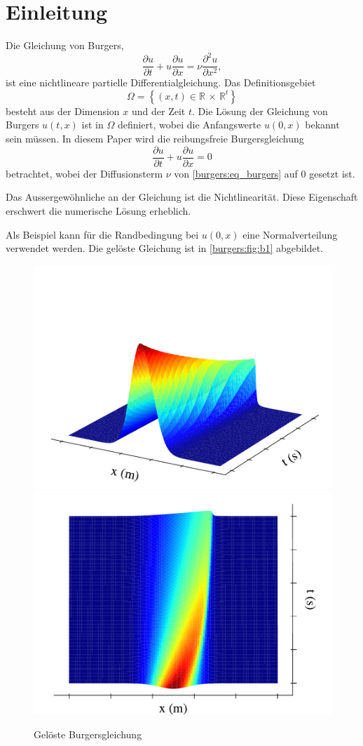 %
%
\section{Einleitung \label{burgers:section:einleitung}}

	Die Gleichung von Burgers,
	\begin{equation}
		  \frac {\partial u}{\partial t}+u{\frac {\partial u}{\partial x}}=\nu {\frac {\partial ^{2}u}{\partial x^{2}}},
		  \label{burgers:eq_burgers}
	\end{equation}
	ist eine nichtlineare partielle Differentialgleichung.
	Das Definitionsgebiet
	\begin{equation}
		\Omega = \left \{ (x,t) \in  \mathbb{R} \, \times \,  \mathbb{R}^t \right \}
	\end{equation}
	besteht aus der Dimension $x$ und der Zeit $t$.
	Die Lösung der Gleichung von Burgers $u(t,x)$ ist in $\Omega$ definiert, wobei die Anfangswerte $u(0,x)$ bekannt sein müssen.
	In diesem Paper wird die reibungsfreie Burgersgleichung
	\begin{equation}
		\frac {\partial u}{\partial t}+u{\frac {\partial u}{\partial x}}=0
		\label{burgers:eq_invisid_burgers}
	\end{equation}
	betrachtet, wobei der Diffusionsterm $\nu$ von \eqref{burgers:eq_burgers} auf 0 gesetzt ist.

	Das Aussergewöhnliche an der Gleichung ist die Nichtlinearität. Diese Eigenschaft erschwert die numerische L\"osung erheblich.

	Als Beispiel kann f\"ur die Randbedingung bei $u(0,x)$ eine Normalverteilung verwendet werden.
	Die gel\"oste Gleichung ist in \autoref{burgers:fig:b1} abgebildet.

	    \begin{figure}
		\centering
		\includegraphics[width=.49\textwidth]{papers/burgers/BurgersEquation/images/Implicit_front.pdf}
		\includegraphics[width=.49\textwidth]{papers/burgers/BurgersEquation/images/Implicit_top.pdf}
		\caption{Gel\"oste Burgersgleichung}
		\label{burgers:fig:b1}
		\end{figure}


